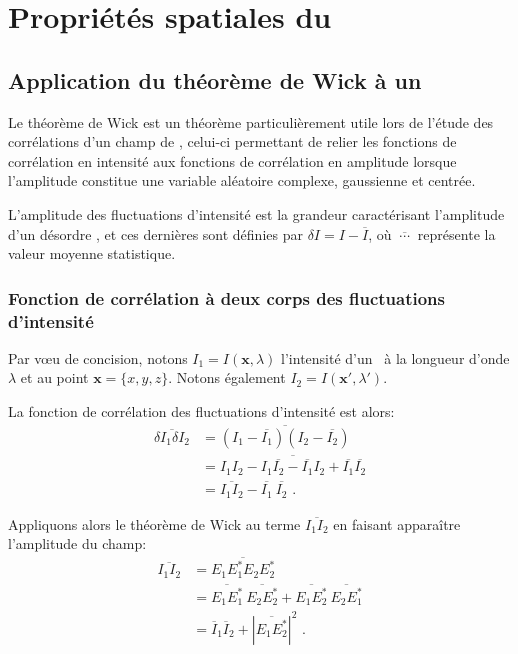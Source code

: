 
\chapter{Propriétés spatiales du \speckle}
\label{ch:anex_speckle}




\section{Application du théorème de Wick à un \speckle }
Le théorème de Wick est un théorème particulièrement utile lors de l'étude des corrélations d'un champ de \speckle , celui-ci permettant de relier les fonctions de corrélation en intensité aux fonctions de corrélation en amplitude lorsque l'amplitude constitue une variable aléatoire complexe, gaussienne et centrée. 

L'amplitude des fluctuations d'intensité est la grandeur caractérisant l'amplitude d'un désordre \speckle, et ces dernières sont définies par $\delta I = I - \overline{I}$, où $\overline{\:\cdots\:}$ représente la valeur moyenne statistique. 

\subsection{Fonction de corrélation à deux corps des fluctuations d'intensité}
Par vœu de concision, notons $I_1=I(\mathbf{x},\lambda)$ l'intensité d'un \speckle\ à la longueur d'onde $\lambda$ et au point $\mathbf{x}=\lbrace x,y,z\rbrace$. Notons également $I_2=I(\mathbf{x}', \lambda')$.

La fonction de corrélation des fluctuations d'intensité est alors: 
\begin{align}
\overline{\delta I_1\delta I_2} &= \overline{(I_1-\overline{I_1}) (I_2-\overline{I_2})} \\
&= \overline{I_1 I_2 - I_1 \overline{I_2} - \overline{I_1} I_2 + \overline{I_1} \overline{I_2}} \\
&=\overline{I_1 I_2} - \overline{I_1}\: \overline{I_2} \text{ .}
\end{align}

Appliquons alors le théorème de Wick au terme $\overline{I_1 I_2}$ en faisant apparaître l'amplitude du champ:
\begin{align}
\overline{I_1 I_2} &= \overline{E_1 E^*_1 E_2 E^*_2} \\
&= \overline{E_1 E^*_1} \: \overline{E_2 E^*_2} + \overline{E_1 E^*_2} \: \overline{E_2 E^*_1} \\
&= \overline{I}_1 \overline{I}_2 + \left| \overline{E_1 E^*_2} \right|^2 \text{ .}
\end{align}

